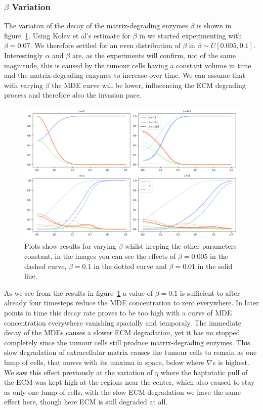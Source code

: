 \subsubsection*{$\beta$ Variation}
The variaton of the decay of the matrix-degrading enzymes $\beta$ is shown in figure~\ref{fig:beta_variation}. Using Kolev et al's estimate for $\beta$ in \cite{Kolev2010} we started experimenting with $\beta=0.07$. We therefore settled for an even distribution of $\beta$ in $\beta \sim U[0.005, 0.1]$. Interestingly $\alpha$ and $\beta$ are, as the experiments will confirm, not of the same magnitude, this is caused by the tumour cells having a constant volume in time and the matrix-degrading enzymes to increase over time. We can assume that with varying $\beta$ the MDE curve will be lower, influcencing the ECM degrading process and therefore also the invasion pace. \newline 
\begin{figure}[h]
    \centering
    \includegraphics[width=\textwidth]{resources/images/beta_variation.png}
    \caption{Plots show results for varying $\beta$ whilst keeping the other parameters constant, in the images you can see the effects of $\beta=0.005$ in the dashed curve, $\beta=0.1$ in the dotted curve and $\beta=0.01$ in the solid line.}
    \label{fig:beta_variation}
\end{figure}
As we see from the results in figure~\ref{fig:beta_variation} a value of $\beta=0.1$ is sufficient to after already four timesteps reduce the MDE concentration to zero everywhere. In later points in time this decay rate proves to be too high with a curve of MDE concentration everywhere vanishing spacially and temporaly. The immediate decay of the MDEs causes a slower ECM degradation, yet it has no stopped completely since the tumour cells still produce matrix-degrading enzymes. This slow degradation of extracellular matrix causes the tumour cells to remain as one lump of cells, that moves with its maxima in space, below where $\nabla e$ is highest. We saw this effect previously at the variation of $\eta$ where the haptotatic pull of the ECM was kept high at the regions near the center, which also caused to stay as only one lump of cells, with the slow ECM degradation we have the same effect here, though here ECM is still degraded at all.\newline
